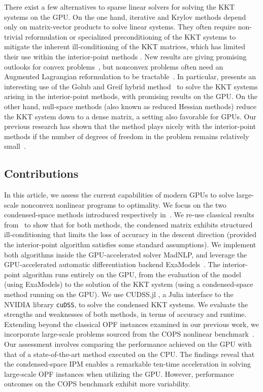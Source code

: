 There exist a few alternatives to sparse linear solvers for solving the KKT systems on the GPU.
On the one hand, iterative and Krylov methods depend only on matrix-vector products to solve linear systems.
They often require non-trivial reformulation or
specialized preconditioning of the KKT systems to mitigate the
inherent ill-conditioning of the KKT matrices, which has limited their
use within the interior-point methods
\cite{curtisNoteImplementationInteriorpoint2012,rodriguezScalablePreconditioningBlockstructured2020}.
New results are giving promising outlooks for convex problems~\cite{ghannad2022linear},
but nonconvex problems often need an Augmented Lagrangian reformulation
to be tractable~\cite{cao2016augmented,regev2023hykkt}. In particular,
\cite{regev2023hykkt} presents an interesting use of the Golub and Greif
hybrid method~\cite{golub2003solving} to solve the KKT systems arising in
the interior-point methods, with promising results on the GPU.
On the other hand, null-space methods (also known as reduced Hessian methods)
reduce the KKT system down to a dense matrix, a setting also favorable for GPUs.
Our previous research has shown that the method plays nicely with the interior-point
methods if the number of degrees of freedom in the problem remains relatively small~\cite{pacaud2022condensed}.


\subsection{Contributions}
In this article, we assess the current capabilities of modern GPUs
to solve large-scale nonconvex nonlinear programs to optimality.
We focus on the two condensed-space methods
introduced respectively in~\cite{regev2023hykkt,shin2023accelerating}.
We re-use classical results from~\cite{wright1998ill} to show
that for both methods, the condensed matrix exhibits
structured ill-conditioning that limits the loss of accuracy in
the descent direction (provided the interior-point algorithm satisfies
some standard assumptions).
We implement both algorithms inside the GPU-accelerated solver MadNLP,
and leverage the GPU-accelerated automatic differentiation
backend ExaModels~\cite{shin2023accelerating}.
The interior-point algorithm runs entirely on the GPU, from
the evaluation of the model (using ExaModels) to the solution of
the KKT system (using a condensed-space method running on the GPU).
We use CUDSS.jl \cite{Montoison_CUDSS}, a Julia interface to the NVIDIA library {\tt cuDSS},
to solve the condensed KKT systems. We evaluate the strengths
and weaknesses of both methods, in terms of accuracy and runtime.
Extending beyond the classical OPF instances examined in our previous work,
we incorporate large-scale problems sourced from the COPS nonlinear benchmark~\cite{dolan2004benchmarking}.
Our assessment involves comparing the performance achieved on the GPU with that of a state-of-the-art method executed on the CPU.
The findings reveal that the condensed-space IPM enables a remarkable ten-time acceleration in solving large-scale OPF instances when utilizing the GPU.
However, performance outcomes on the COPS benchmark exhibit more variability.

